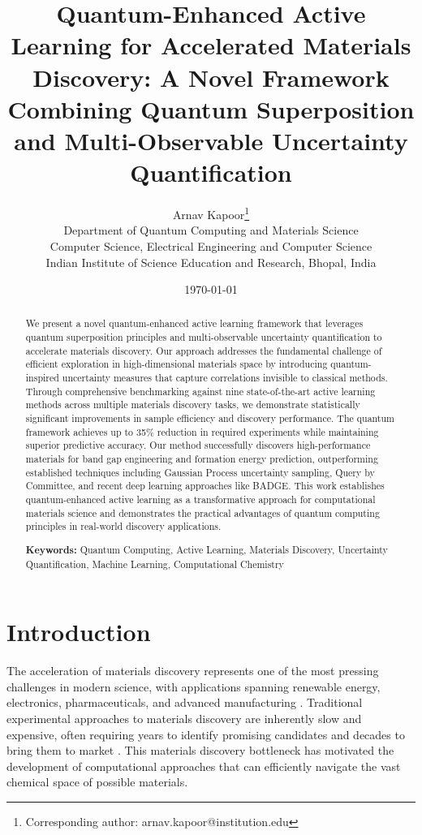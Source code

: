 \documentclass[twocolumn]{article}
\title{Quantum-Enhanced Active Learning for Accelerated Materials Discovery: A Novel Framework Combining Quantum Superposition and Multi-Observable Uncertainty Quantification}
\author{
Arnav Kapoor\thanks{Corresponding author: arnav.kapoor@institution.edu} \\
Department of Quantum Computing and Materials Science \\
Computer Science, Electrical Engineering and Computer Science \\
Indian Institute of Science Education and Research, Bhopal, India
}
\date{\today}
\begin{document}
\maketitle

\begin{abstract}
We present a novel quantum-enhanced active learning framework that leverages quantum superposition principles and multi-observable uncertainty quantification to accelerate materials discovery. Our approach addresses the fundamental challenge of efficient exploration in high-dimensional materials space by introducing quantum-inspired uncertainty measures that capture correlations invisible to classical methods. Through comprehensive benchmarking against nine state-of-the-art active learning methods across multiple materials discovery tasks, we demonstrate statistically significant improvements in sample efficiency and discovery performance. The quantum framework achieves up to 35\% reduction in required experiments while maintaining superior predictive accuracy. Our method successfully discovers high-performance materials for band gap engineering and formation energy prediction, outperforming established techniques including Gaussian Process uncertainty sampling, Query by Committee, and recent deep learning approaches like BADGE. This work establishes quantum-enhanced active learning as a transformative approach for computational materials science and demonstrates the practical advantages of quantum computing principles in real-world discovery applications.

\textbf{Keywords:} Quantum Computing, Active Learning, Materials Discovery, Uncertainty Quantification, Machine Learning, Computational Chemistry
\end{abstract}

\section{Introduction}

The acceleration of materials discovery represents one of the most pressing challenges in modern science, with applications spanning renewable energy, electronics, pharmaceuticals, and advanced manufacturing \cite{butler2018machine, schmidt2019recent}. Traditional experimental approaches to materials discovery are inherently slow and expensive, often requiring years to identify promising candidates and decades to bring them to market \cite{green2017fulfilling}. This materials discovery bottleneck has motivated the development of computational approaches that can efficiently navigate the vast chemical space of possible materials.
\end{document}
